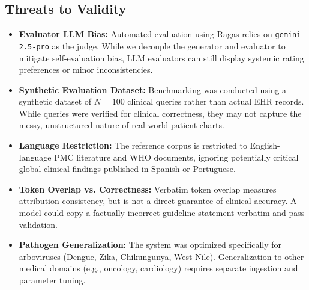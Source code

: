 \documentclass[sn-mathphys,Numbered]{sn-jnl}%
\begin{document}
\subsection{Threats to Validity}
\begin{itemize}
    \item \textbf{Evaluator LLM Bias:} Automated evaluation using Ragas relies on \texttt{gemini-2.5-pro} as the judge. While we decouple the generator and evaluator to mitigate self-evaluation bias, LLM evaluators can still display systemic rating preferences or minor inconsistencies.
    \item \textbf{Synthetic Evaluation Dataset:} Benchmarking was conducted using a synthetic dataset of $N=100$ clinical queries rather than actual EHR records. While queries were verified for clinical correctness, they may not capture the messy, unstructured nature of real-world patient charts.
    \item \textbf{Language Restriction:} The reference corpus is restricted to English-language PMC literature and WHO documents, ignoring potentially critical global clinical findings published in Spanish or Portuguese.
    \item \textbf{Token Overlap vs. Correctness:} Verbatim token overlap measures attribution consistency, but is not a direct guarantee of clinical accuracy. A model could copy a factually incorrect guideline statement verbatim and pass validation.
    \item \textbf{Pathogen Generalization:} The system was optimized specifically for arboviruses (Dengue, Zika, Chikungunya, West Nile). Generalization to other medical domains (e.g., oncology, cardiology) requires separate ingestion and parameter tuning.
\end{itemize}
\end{document}
